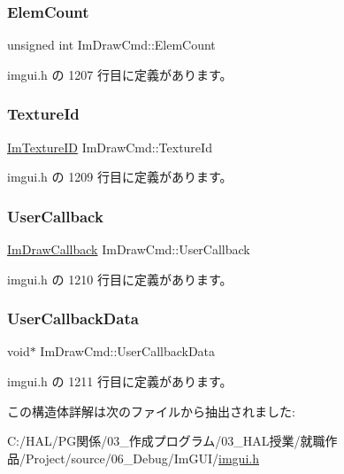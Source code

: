 \subsubsection{\texorpdfstring{Elem\+Count}{ElemCount}}
{\footnotesize\ttfamily unsigned int Im\+Draw\+Cmd\+::\+Elem\+Count}



 imgui.\+h の 1207 行目に定義があります。

\mbox{\label{struct_im_draw_cmd_a4f3b5985ece9ca6b71e7a8e7d85a82e5}} 
\subsubsection{\texorpdfstring{Texture\+Id}{TextureId}}
{\footnotesize\ttfamily \mbox{\hyperlink{imgui_8h_a364f4447ecbc4ca176145ccff9db6286}{Im\+Texture\+ID}} Im\+Draw\+Cmd\+::\+Texture\+Id}



 imgui.\+h の 1209 行目に定義があります。

\mbox{\label{struct_im_draw_cmd_ad26dac4e939f5c4bb892cbca0f9e3af8}} 
\subsubsection{\texorpdfstring{User\+Callback}{UserCallback}}
{\footnotesize\ttfamily \mbox{\hyperlink{imgui_8h_a232a477233f9e3ab7640720bf94674de}{Im\+Draw\+Callback}} Im\+Draw\+Cmd\+::\+User\+Callback}



 imgui.\+h の 1210 行目に定義があります。

\mbox{\label{struct_im_draw_cmd_ae2f5a0baf4a0b25942237b8ce6adb42d}} 
\subsubsection{\texorpdfstring{User\+Callback\+Data}{UserCallbackData}}
{\footnotesize\ttfamily void$\ast$ Im\+Draw\+Cmd\+::\+User\+Callback\+Data}



 imgui.\+h の 1211 行目に定義があります。



この構造体詳解は次のファイルから抽出されました\+:\begin{DoxyCompactItemize}
\item 
C\+:/\+H\+A\+L/\+P\+G関係/03\+\_\+作成プログラム/03\+\_\+\+H\+A\+L授業/就職作品/\+Project/source/06\+\_\+\+Debug/\+Im\+G\+U\+I/\mbox{\hyperlink{imgui_8h}{imgui.\+h}}\end{DoxyCompactItemize}
